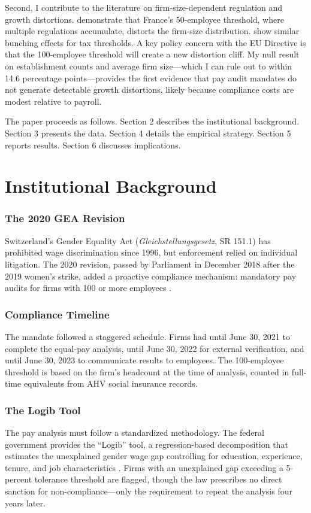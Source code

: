 \documentclass[12pt]{article}
\begin{document}
Second, I contribute to the literature on firm-size-dependent regulation and growth distortions. \citet{garicano2016firm} demonstrate that France's 50-employee threshold, where multiple regulations accumulate, distorts the firm-size distribution. \citet{gourio2014firm} show similar bunching effects for tax thresholds. A key policy concern with the EU Directive is that the 100-employee threshold will create a new distortion cliff. My null result on establishment counts and average firm size---which I can rule out to within 14.6 percentage points---provides the first evidence that pay audit mandates do not generate detectable growth distortions, likely because compliance costs are modest relative to payroll.

The paper proceeds as follows. Section 2 describes the institutional background. Section 3 presents the data. Section 4 details the empirical strategy. Section 5 reports results. Section 6 discusses implications.


\section{Institutional Background}

\subsubsection*{The 2020 GEA Revision} Switzerland's Gender Equality Act (\textit{Gleichstellungsgesetz}, SR 151.1) has prohibited wage discrimination since 1996, but enforcement relied on individual litigation. The 2020 revision, passed by Parliament in December 2018 after the 2019 women's strike, added a proactive compliance mechanism: mandatory pay audits for firms with 100 or more employees \citep{swiss_gea_2020}.

\subsubsection*{Compliance Timeline} The mandate followed a staggered schedule. Firms had until June 30, 2021 to complete the equal-pay analysis, until June 30, 2022 for external verification, and until June 30, 2023 to communicate results to employees. The 100-employee threshold is based on the firm's headcount at the time of analysis, counted in full-time equivalents from AHV social insurance records.

\subsubsection*{The Logib Tool} The pay analysis must follow a standardized methodology. The federal government provides the ``Logib'' tool, a regression-based decomposition that estimates the unexplained gender wage gap controlling for education, experience, tenure, and job characteristics \citep{logib_tool}. Firms with an unexplained gap exceeding a 5-percent tolerance threshold are flagged, though the law prescribes no direct sanction for non-compliance---only the requirement to repeat the analysis four years later.
\end{document}
